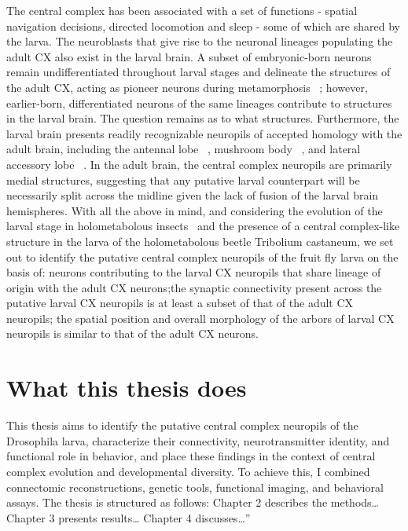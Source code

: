     The central complex has been associated with a set of functions - spatial navigation decisions, directed locomotion and sleep - some of which are shared by the larva. The neuroblasts that give rise to the neuronal lineages populating the adult CX also exist in the larval brain. A subset of embryonic-born neurons remain undifferentiated throughout larval stages and delineate the structures of the adult CX, acting as pioneer neurons during metamorphosis 
    ~\citep{andrade2019developmentally}; however, earlier-born, differentiated neurons of the same lineages contribute to structures in the larval brain. The question remains as to what structures. Furthermore, the larval brain presents readily recognizable neuropils of accepted homology with the adult brain, including the antennal lobe ~\citep{berck2016wiring}, mushroom body ~\citep{eichler2017complete}, and lateral accessory lobe ~\citep{hartenstein2015lineage}.
    In the adult brain, the central complex neuropils are primarily medial structures, suggesting that any putative larval counterpart will be necessarily split across the midline given the lack of fusion of the larval brain hemispheres. With all the above in mind, and considering the evolution of the larval stage in holometabolous insects ~\citep{truman1999origins}and the presence of a central complex-like structure in the larva of the holometabolous beetle Tribolium castaneum, we set out to identify the putative central complex neuropils of the fruit fly larva on the basis of: neurons contributing to the larval CX neuropils that share lineage of origin with the adult CX neurons;the synaptic connectivity present across the putative larval CX neuropils is at least a subset of that of the adult CX neuropils; the spatial position and overall morphology of the arbors of larval CX neuropils is similar to that of the adult CX neurons. 


\section{What this thesis does}

This thesis aims to identify the putative central complex neuropils of the Drosophila larva, characterize their connectivity, neurotransmitter identity, and functional role in behavior, and place these findings in the context of central complex evolution and developmental diversity. To achieve this, I combined connectomic reconstructions, genetic tools, functional imaging, and behavioral assays. The thesis is structured as follows: Chapter 2 describes the methods… Chapter 3 presents results… Chapter 4 discusses…”
